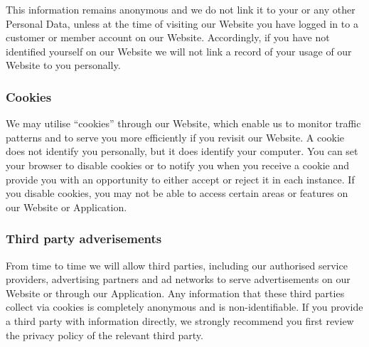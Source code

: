 \documentclass[10pt]{article}
\begin{document}
This information remains anonymous and we do not link it to your or any other Personal Data, unless at the time of visiting our Website you have logged in to a customer or member account on our Website. Accordingly, if you have not identified yourself on our Website we will not link a record of your usage of our Website to you personally.

\subsubsection{Cookies}
We may utilise ``cookies'' through our Website, which enable us to monitor traffic patterns and to serve you more efficiently if you revisit our Website. A cookie does not identify you personally, but it does identify your computer. You can set your browser to disable cookies or to notify you when you receive a cookie and provide you with an opportunity to either accept or reject it in each instance. If you disable cookies, you may not be able to access certain areas or features on our Website or Application.

\subsubsection{Third party adverisements}
From time to time we will allow third parties, including our authorised service providers, advertising partners and ad networks to serve advertisements on our Website or through our Application. Any information that these third parties collect via cookies is completely anonymous and is non-identifiable. If you provide a third party with information directly, we strongly recommend you first review the privacy policy of the relevant third party.
\end{document}

